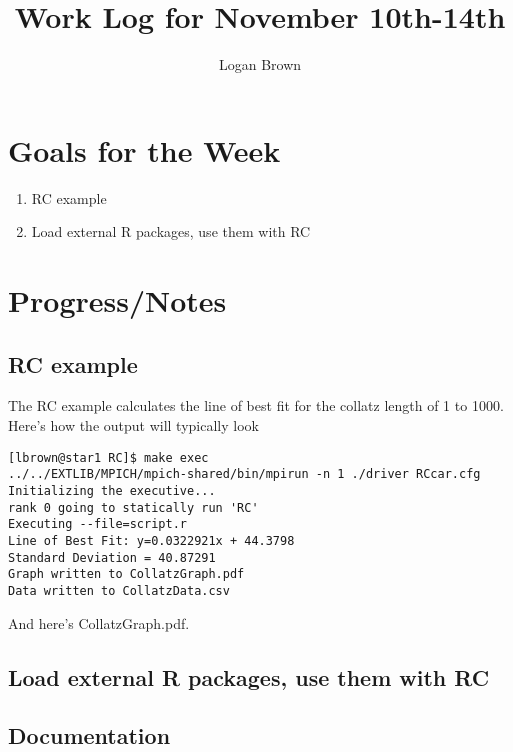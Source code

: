 

\title{Work Log for November 10th-14th}
\author{Logan Brown}


\maketitle


\section{Goals for the Week}
\begin{enumerate}
	\item RC example
	\item Load external R packages, use them with RC
\end{enumerate}

\section{Progress/Notes}

\subsection{RC example}

The RC example calculates the line of best fit for the collatz length of 1 to 1000. Here's how the output will typically look

\begin{verbatim}
[lbrown@star1 RC]$ make exec
../../EXTLIB/MPICH/mpich-shared/bin/mpirun -n 1 ./driver RCcar.cfg
Initializing the executive...
rank 0 going to statically run 'RC'
Executing --file=script.r
Line of Best Fit: y=0.0322921x + 44.3798
Standard Deviation = 40.87291
Graph written to CollatzGraph.pdf 
Data written to CollatzData.csv 
\end{verbatim}

And here's CollatzGraph.pdf.



\subsection{Load external R packages, use them with RC}


\subsection{Documentation}

